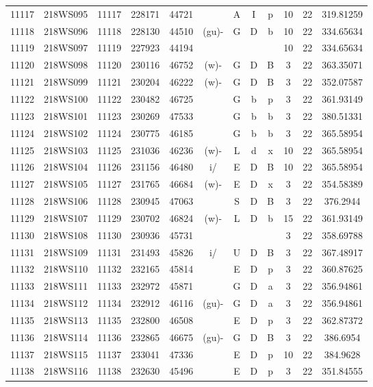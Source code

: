 \begin{tabular}{|*{12}{c|}}
11117 & 218WS095 & 11117 & 228171 & 44721 &  & A & I & p & 10 & 22 & 319.81259 \\ 
11118 & 218WS096 & 11118 & 228130 & 44510 & (gu)- & G & D & b & 10 & 22 & 334.65634 \\ 
11119 & 218WS097 & 11119 & 227923 & 44194 &  &  &  &  & 10 & 22 & 334.65634 \\ 
11120 & 218WS098 & 11120 & 230116 & 46752 & (w)- & G & D & B & 3 & 22 & 363.35071 \\ 
11121 & 218WS099 & 11121 & 230204 & 46222 & (w)- & G & D & B & 3 & 22 & 352.07587 \\ 
11122 & 218WS100 & 11122 & 230482 & 46725 &  & G & b & p & 3 & 22 & 361.93149 \\ 
11123 & 218WS101 & 11123 & 230269 & 47533 &  & G & b & b & 3 & 22 & 380.51331 \\ 
11124 & 218WS102 & 11124 & 230775 & 46185 &  & G & b & b & 3 & 22 & 365.58954 \\ 
11125 & 218WS103 & 11125 & 231036 & 46236 & (w)- & L & d & x & 10 & 22 & 365.58954 \\ 
11126 & 218WS104 & 11126 & 231156 & 46480 & i/ & E & D & B & 10 & 22 & 365.58954 \\ 
11127 & 218WS105 & 11127 & 231765 & 46684 & (w)- & E & D & x & 3 & 22 & 354.58389 \\ 
11128 & 218WS106 & 11128 & 230945 & 47063 &  & S & D & B & 3 & 22 & 376.2944 \\ 
11129 & 218WS107 & 11129 & 230702 & 46824 & (w)- & L & D & b & 15 & 22 & 361.93149 \\ 
11130 & 218WS108 & 11130 & 230936 & 45731 &  &  &  &  & 3 & 22 & 358.69788 \\ 
11131 & 218WS109 & 11131 & 231493 & 45826 & i/ & U & D & B & 3 & 22 & 367.48917 \\ 
11132 & 218WS110 & 11132 & 232165 & 45814 &  & E & D & p & 3 & 22 & 360.87625 \\ 
11133 & 218WS111 & 11133 & 232972 & 45871 &  & G & D & a & 3 & 22 & 356.94861 \\ 
11134 & 218WS112 & 11134 & 232912 & 46116 & (gu)- & G & D & a & 3 & 22 & 356.94861 \\ 
11135 & 218WS113 & 11135 & 232800 & 46508 &  & E & D & p & 3 & 22 & 362.87372 \\ 
11136 & 218WS114 & 11136 & 232865 & 46675 & (gu)- & G & D & B & 3 & 22 & 386.6954 \\ 
11137 & 218WS115 & 11137 & 233041 & 47336 &  & E & D & p & 10 & 22 & 384.9628 \\ 
11138 & 218WS116 & 11138 & 232630 & 45496 &  & E & D & p & 3 & 22 & 351.84555 \\ 

\end{tabular}
